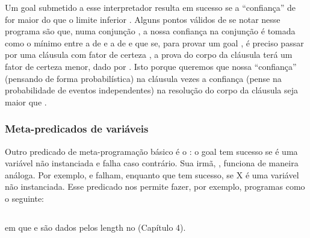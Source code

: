 \documentclass{article}
\begin{document}
\inputminted{prolog}{../Exemplos/Cap6/prog5_meta2.pl}

Um goal  %
submetido a esse interpretador resulta em sucesso se a ``confiança''  de 
for maior do que o limite inferior . Alguns pontos válidos de se notar nesse programa são que, numa conjunção ,
a nossa confiança na conjunção é tomada como o mínimo entre a de  e a de  e que se, para provar um goal , é
preciso passar por uma cláusula com fator de certeza , a prova do corpo da cláusula terá um fator de certeza menor, dado
por . Isto porque queremos que nossa ``confiança'' (pensando de forma probabilística)  na cláusula vezes
a confiança  (pense na probabilidade de eventos independentes) na resolução do corpo da cláusula seja maior que .

\subsubsection{Meta-predicados de variáveis}

Outro predicado de meta-programação básico é o : o goal  tem sucesso se
 é uma variável não instanciada e falha caso contrário. Sua irmã, , funciona de maneira análoga. Por exemplo,  e  falham, enquanto que  tem sucesso, se X é uma variável não instanciada.
Esse predicado nos permite fazer, por exemplo, programas como o seguinte:

\inputminted{prolog}{../Exemplos/Cap6/prog6_glength.pl}

\noindent em que  e  são dados pelos length no (Capítulo 4).
\end{document}
